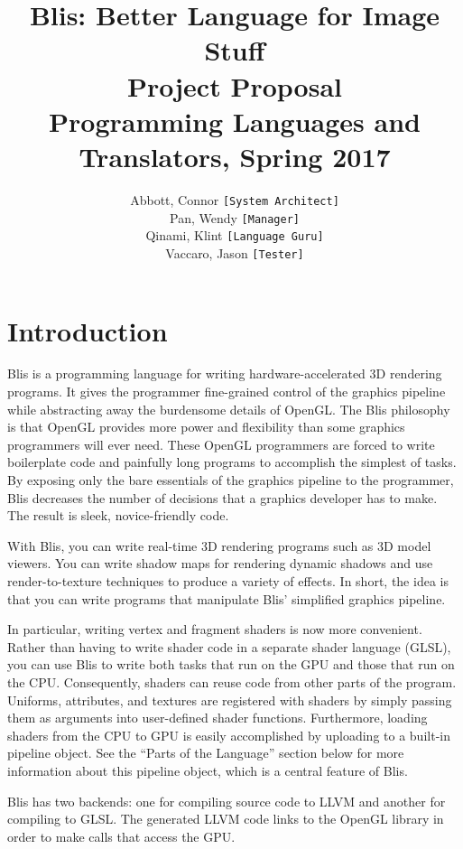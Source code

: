 \documentclass[11pt]{article}
\title{Blis: Better Language for Image Stuff \\
\Large Project Proposal \\
\Large Programming Languages and Translators, Spring 2017 }
\author{
  Abbott, Connor  \hspace{5mm} \hfill \texttt{[System Architect]} \\
  Pan, Wendy                   \hfill \texttt{[Manager]}          \\
  Qinami, Klint                \hfill \texttt{[Language Guru]}    \\
  Vaccaro, Jason               \hfill \texttt{[Tester]}       
}
\begin{document}
\maketitle

\section{Introduction}

    Blis is a programming language for writing
    hardware-accelerated 3D rendering programs. 
    It gives the programmer fine-grained control of the 
    graphics pipeline while abstracting away the burdensome 
    details of OpenGL. The Blis philosophy is that OpenGL 
    provides more power and flexibility than some graphics 
    programmers will ever need. These OpenGL programmers are 
    forced to write boilerplate code and painfully long 
    programs to accomplish the simplest of tasks. By exposing %
    only the bare essentials of the graphics pipeline to the 
    programmer,  Blis decreases the number of decisions that 
    a graphics developer has to make. The result is sleek, 
    novice-friendly code.
    
    
    With Blis, you can write real-time 3D rendering programs 
    such as 3D model viewers. You can write shadow maps for 
    rendering dynamic shadows and use render-to-texture 
    techniques to produce a variety of effects. In short, the 
    idea is that you can write programs that manipulate Blis’
    simplified graphics pipeline.
    
    
    In particular, writing vertex and fragment shaders is now more convenient. 
    Rather than having to write shader code in a separate shader language 
    (GLSL), you can use Blis to write both tasks that run on the GPU and those 
    that run on the CPU. Consequently, shaders can reuse code from other parts 
    of the program. Uniforms, attributes, and textures are registered with 
    shaders by simply passing them as arguments into user-defined shader 
    functions. Furthermore, loading shaders from the CPU to GPU is easily 
    accomplished by uploading to a built-in pipeline object. See the “Parts of 
    the Language” section below for more information about this pipeline object, %
    which is a central feature of Blis. 
    
    Blis has two backends: one for compiling source code to LLVM and another for %
    compiling to GLSL. The generated LLVM code links to the OpenGL library in 
    order to make calls that access the GPU. 
\end{document}
